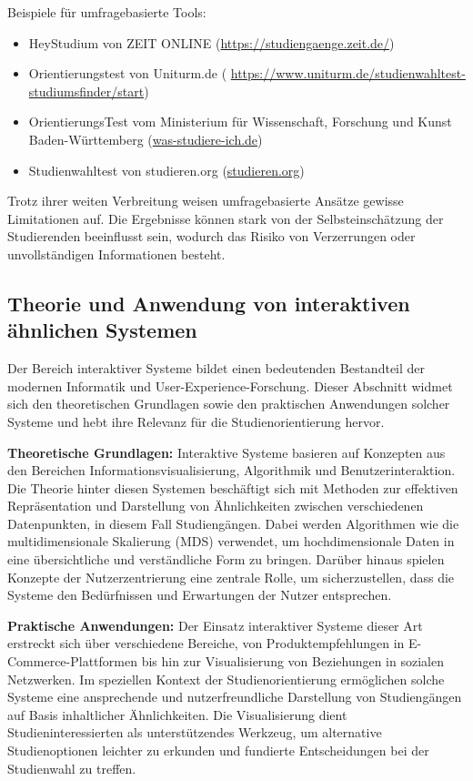 Beispiele für umfragebasierte Tools:
\begin{itemize}
    \item HeyStudium von ZEIT ONLINE (\url{https://studiengaenge.zeit.de/})
    \item Orientierungstest von Uniturm.de (
        \url{https://www.uniturm.de/studienwahltest-studiumsfinder/start})
    \item OrientierungsTest vom Ministerium für Wissenschaft, Forschung und
        Kunst Baden-Württemberg (\url{was-studiere-ich.de})
    \item Studienwahltest von studieren.org (\url{studieren.org})
\end{itemize}

Trotz ihrer weiten Verbreitung weisen umfragebasierte Ansätze gewisse
Limitationen auf. Die Ergebnisse können stark von der Selbsteinschätzung der
Studierenden beeinflusst sein, wodurch das Risiko von Verzerrungen oder
unvollständigen Informationen besteht.

\subsection{Theorie und Anwendung von interaktiven ähnlichen Systemen}
Der Bereich interaktiver Systeme bildet einen bedeutenden Bestandteil der modernen Informatik und User-Experience-Forschung. Dieser Abschnitt widmet sich den theoretischen Grundlagen sowie den praktischen Anwendungen solcher Systeme und hebt ihre Relevanz für die Studienorientierung hervor. \parencite{preim_interaktive_2010}

\textbf{Theoretische Grundlagen:}
Interaktive Systeme basieren auf Konzepten aus den Bereichen
Informationsvisualisierung, Algorithmik und Benutzerinteraktion. Die Theorie
hinter diesen Systemen beschäftigt sich mit Methoden zur effektiven
Repräsentation und Darstellung von Ähnlichkeiten zwischen verschiedenen
Datenpunkten, in diesem Fall Studiengängen. Dabei werden Algorithmen wie die
multidimensionale Skalierung (MDS) verwendet, um hochdimensionale Daten in eine
übersichtliche und verständliche Form zu bringen. Darüber hinaus spielen
Konzepte der Nutzerzentrierung eine zentrale Rolle, um sicherzustellen, dass die
Systeme den Bedürfnissen und Erwartungen der Nutzer entsprechen.

\textbf{Praktische Anwendungen:}
Der Einsatz interaktiver Systeme dieser Art erstreckt sich über verschiedene
Bereiche, von Produktempfehlungen in E-Commerce-Plattformen bis hin zur
Visualisierung von Beziehungen in sozialen Netzwerken. Im speziellen Kontext der Studienorientierung ermöglichen solche Systeme eine ansprechende und nutzerfreundliche Darstellung von Studiengängen auf Basis inhaltlicher Ähnlichkeiten. Die Visualisierung dient Studieninteressierten als unterstützendes Werkzeug, um alternative Studienoptionen leichter zu erkunden und fundierte Entscheidungen bei der Studienwahl zu treffen.

